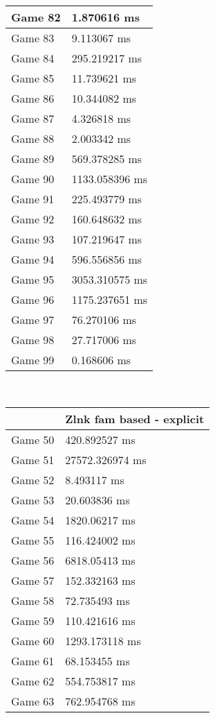 \begin{multicols}{2}
\begin{tabular}{|l|l|}
	Game 82 & 1.870616 ms \\ \hline
	Game 83 & 9.113067 ms \\ \hline
	Game 84 & 295.219217 ms \\ \hline
	Game 85 & 11.739621 ms \\ \hline
	Game 86 & 10.344082 ms \\ \hline
	Game 87 & 4.326818 ms \\ \hline
	Game 88 & 2.003342 ms \\ \hline
	Game 89 & 569.378285 ms \\ \hline
	Game 90 & 1133.058396 ms \\ \hline
	Game 91 & 225.493779 ms \\ \hline
	Game 92 & 160.648632 ms \\ \hline
	Game 93 & 107.219647 ms \\ \hline
	Game 94 & 596.556856 ms \\ \hline
	Game 95 & 3053.310575 ms \\ \hline
	Game 96 & 1175.237651 ms \\ \hline
	Game 97 & 76.270106 ms \\ \hline
	Game 98 & 27.717006 ms \\ \hline
	Game 99 & 0.168606 ms \\ \hline
\end{tabular}\\
\begin{tabular}{|l|l|}
	\hline
	& Zlnk fam based - explicit \\ \hline
	Game 50 & 420.892527 ms \\ \hline
	Game 51 & 27572.326974 ms \\ \hline
	Game 52 & 8.493117 ms \\ \hline
	Game 53 & 20.603836 ms \\ \hline
	Game 54 & 1820.06217 ms \\ \hline
	Game 55 & 116.424002 ms \\ \hline
	Game 56 & 6818.05413 ms \\ \hline
	Game 57 & 152.332163 ms \\ \hline
	Game 58 & 72.735493 ms \\ \hline
	Game 59 & 110.421616 ms \\ \hline
	Game 60 & 1293.173118 ms \\ \hline
	Game 61 & 68.153455 ms \\ \hline
	Game 62 & 554.753817 ms \\ \hline
	Game 63 & 762.954768 ms \\ \hline

\end{tabular}
\end{multicols}
